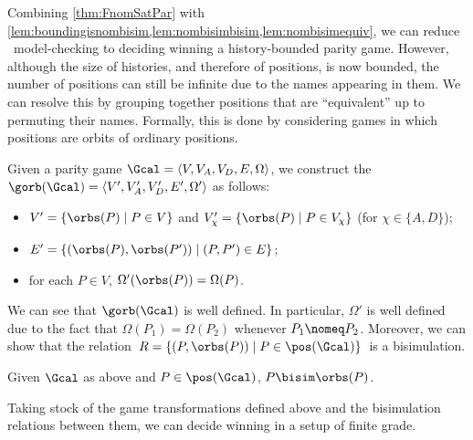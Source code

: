 Combining \cref{thm:FnomSatPar} with \cref{lem:boundingisnombisim,lem:nombisimbisim,lem:nombisimequiv}, we can reduce \fhml\ model-checking to deciding winning a history-bounded parity game. However,
although the size of histories, and therefore of positions, is now bounded, the number of positions can still be infinite due to the names appearing in them. We can resolve this by grouping together positions that are ``equivalent'' up to permuting their names. Formally, this is done by considering games in which positions are orbits of ordinary positions.


\begin{definition} 
    Given a parity game $\Gcal=\langle V,V_A,V_D,E,\Omega\rangle$, 
    we construct the  $\gorb(\Gcal)=\langle V',V_A',V_D',E',\Omega'\rangle$ as follows:
    \begin{itemize}
    \item $V' = \{\orbs(P) \mid P \in V\}$ and $V_\chi'=\{\orbs(P) \mid P \in V_\chi\}$ (for $\chi\in\{A,D\}$);
      \item $E'=\{(\orbs(P),\orbs(P'))\mid (P,P')\in E\}$;
        \item  for each $P\in V$, $\Omega'(\orbs(P)) = \Omega(P)$. 
    \end{itemize}
\end{definition}

We can see that $\gorb(\Gcal)$ is well defined. In particular, $\Omega'$ is well defined due to the fact that $\Omega(P_1)=\Omega(P_2)$ whenever $P_1\nomeq P_2$.  
Moreover, we can show that the relation\ $R
=        \{(P, \orbs(P)) \mid P \in \pos(\Gcal)\}$\ is a bisimulation.


\begin{lemma}\label{lem:parityBisim}
  Given $\Gcal$ as above and $P\in\pos(\Gcal)$, $P\bisim\orbs(P)$.
\end{lemma}

Taking stock of the game transformations defined above and the bisimulation relations between them, we can decide winning in a setup of finite grade.

